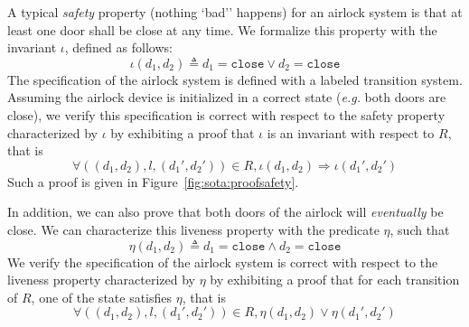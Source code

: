 \begin{example}
  A typical \emph{safety} property (nothing `bad'' happens) for an airlock
  system is that at least one door shall be close at any time.
  We formalize this property with the invariant \( \iota \), defined as follows:
  \[
    \iota( d_1, d_2) \triangleq d_1 = \mathtt{close} \vee d_2 = \mathtt{close}
  \]
  The specification of the airlock system is defined with a labeled transition
  system.
  Assuming the airlock device is initialized in a correct state (\emph{e.g.}
  both doors are close), we verify this specification is correct with respect to
  the safety property characterized by \( \iota \) by exhibiting a proof that
  \( \iota \) is an invariant with respect to \( R \), that is
  \[
    \forall ((d_1, d_2), l, (d_1', d_2')) \in R, \iota(d_1, d_2) \Rightarrow
    \iota(d_1', d_2')
  \]
  Such a proof is given in Figure~\ref{fig:sota:proofsafety}.

  In addition, we can also prove that both doors of the airlock will
  \emph{eventually} be close.
  We can characterize this liveness property with the predicate \( \eta \), such
  that
  \[
    \eta(d_1, d_2) \triangleq d_1 = \mathtt{close} \wedge d_2 = \mathtt{close}
  \]
  We verify the specification of the airlock system is correct with respect to
  the liveness property characterized by \( \eta \) by exhibiting a proof that
  for each transition of \( R \), one of the state satisfies \( \eta \), that is
  \[
    \forall ((d_1, d_2), l, (d_1', d_2')) \in R, \eta(d_1, d_2) \vee
    \eta(d_1', d_2')
  \]

\end{example}

